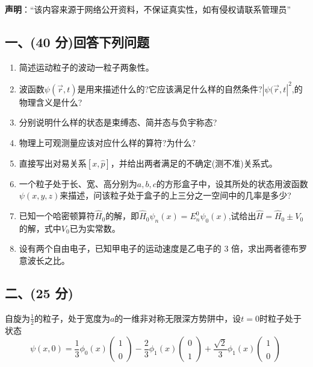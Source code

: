 
\textbf{声明}：“该内容来源于网络公开资料，不保证真实性，如有侵权请联系管理员”

\subsection{一、(40 分)回答下列问题}
\begin{enumerate}
\item 简述运动粒子的波动一粒子两象性。
\item 波函数$\psi(\vec{r},t)$是用来描述什么的?它应该满足什么样的自然条件?$|\psi(\vec{r},t|^2$,的物理含义是什么?
\item 分别说明什么样的状态是束缚态、简并态与负宇称态?
\item 物理上可观测量应该对应什么样的算符?为什么?
\item 直接写出对易关系$[x,\hat{p}]$，并给出两者满足的不确定(测不准)关系式。
\item 一个粒子处于长、宽、高分别为$a,b,c$的方形盒子中，设其所处的状态用波函数$\psi(x,y,z)$来描述，问该粒子处于盒子的上三分之一空间中的几率是多少?
\item 已知一个哈密顿算符$\hat{H}_0$的解，即$\hat{H}_0\psi_n(x)=E^0_n\psi_0(x)$,试给出$\hat{H}=\hat{H}_0\pm V_0$的解，式中$V_0$已为实常数。
\item 设有两个自由电子，已知甲电子的运动速度是乙电子的 3 倍，求出两者德布罗意波长之比。
\end{enumerate}
\subsection{二、(25 分)}
自旋为$\frac{1}{2}$的粒子，处于宽度为$a$的一维非对称无限深方势阱中，设$t=0$时粒子处于状态
$$\psi(x,0) = \frac{1}{3} \phi_0(x) 
\begin{pmatrix}
1 \\\\
0
\end{pmatrix}
-\frac{2}{3} \phi_1(x) 
\begin{pmatrix}
0 \\\\
1
\end{pmatrix}
+ \frac{\sqrt{2}}{3} \phi_1(x)
\begin{pmatrix}
1 \\\\
0
\end{pmatrix}~$$